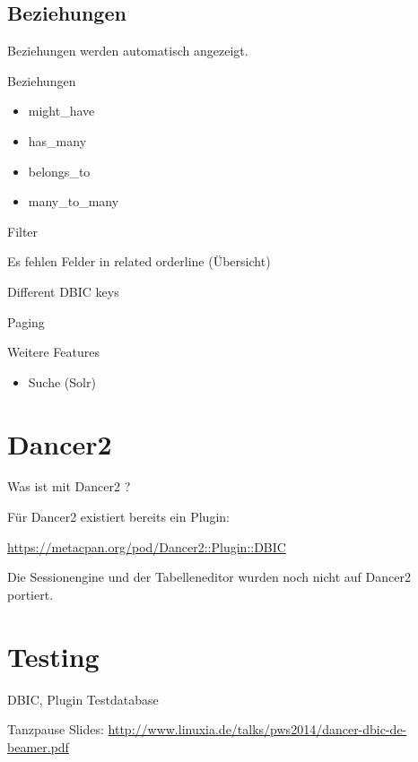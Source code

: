 \subsection{Beziehungen}

Beziehungen werden automatisch angezeigt.

\begin{frame}{Beziehungen}
\begin{itemize}
\item might\_have
\item has\_many
\item belongs\_to
\item many\_to\_many
\end{itemize}
\end{frame}

Filter

Es fehlen Felder in related orderline (Übersicht)

Different DBIC keys

Paging

\begin{frame}{Weitere Features}
\begin{itemize}
\item Suche (Solr)
\end{itemize}
\end{frame}

\section{Dancer2}

Was ist mit Dancer2 ?

Für Dancer2 existiert bereits ein Plugin:

\url{https://metacpan.org/pod/Dancer2::Plugin::DBIC}

Die Sessionengine und der Tabelleneditor wurden noch nicht auf Dancer2 portiert.

\section{Testing}
DBIC, Plugin
Testdatabase

\begin{frame}{Tanzpause}
Slides:
\url{http://www.linuxia.de/talks/pws2014/dancer-dbic-de-beamer.pdf}
\end{frame}



